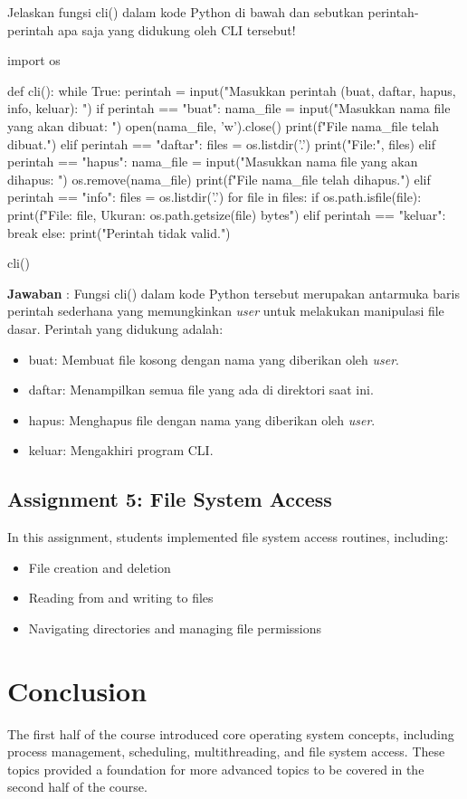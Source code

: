 \documentclass[12pt]{article}
\begin{document}
Jelaskan fungsi cli() dalam kode Python di bawah dan sebutkan perintah-perintah apa saja yang didukung oleh CLI tersebut!

\begin{python}
import os

def cli():
    while True:
        perintah = input("Masukkan perintah (buat, daftar, hapus, info, keluar): ")
        if perintah == "buat":
            nama_file = input("Masukkan nama file yang akan dibuat: ")
            open(nama_file, 'w').close()
            print(f"File {nama_file} telah dibuat.")
        elif perintah == "daftar":
            files = os.listdir('.')
            print("File:", files)
        elif perintah == "hapus":
            nama_file = input("Masukkan nama file yang akan dihapus: ")
            os.remove(nama_file)
            print(f"File {nama_file} telah dihapus.")
        elif perintah == "info":
            files = os.listdir('.')
            for file in files:
                if os.path.isfile(file):
                    print(f"File: {file}, Ukuran: {os.path.getsize(file)} bytes")
        elif perintah == "keluar":
            break
        else:
            print("Perintah tidak valid.")

cli()

\end{python}

\textbf{Jawaban} : Fungsi cli() dalam kode Python tersebut merupakan antarmuka baris perintah sederhana yang memungkinkan \textit{user} untuk melakukan manipulasi file dasar. Perintah yang didukung adalah:

\begin{itemize}
    \item buat: Membuat file kosong dengan nama yang diberikan oleh \textit{user}.
    \item daftar: Menampilkan semua file yang ada di direktori saat ini.
    \item hapus: Menghapus file dengan nama yang diberikan oleh \textit{user}.
    \item keluar: Mengakhiri program CLI.
\end{itemize}

\subsection{Assignment 5: File System Access}
In this assignment, students implemented file system access routines, including:
\begin{itemize}
    \item File creation and deletion
    \item Reading from and writing to files
    \item Navigating directories and managing file permissions
\end{itemize}

\section{Conclusion}
The first half of the course introduced core operating system concepts, including process management, scheduling, multithreading, and file system access. These topics provided a foundation for more advanced topics to be covered in the second half of the course.
\end{document}
